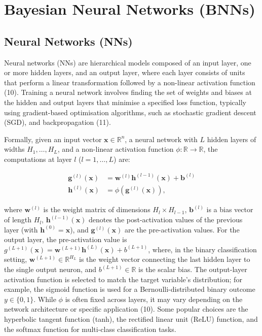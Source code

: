 \documentclass[
  a4paper,
]{scrreprt}
\begin{document}
\section{Bayesian Neural Networks
(BNNs)}\label{bayesian-neural-networks-bnns}

\subsection{Neural Networks (NNs)}\label{neural-networks-nns}

Neural networks (NNs) are hierarchical models composed of an input
layer, one or more hidden layers, and an output layer, where each layer
consists of units that perform a linear transformation followed by a
non-linear activation function (10). Training a neural network involves
finding the set of weights and biases at the hidden and output layers
that minimise a specified loss function, typically using gradient-based
optimisation algorithms, such as stochastic gradient descent (SGD), and
backpropagation (11).

Formally, given an input vector \(\mathbf{x} \in \mathbb{R}^n\), a
neural network with \(L\) hidden layers of widths \(H_1, \dots, H_L\),
and a non-linear activation function
\(\phi: \mathbb{R} \rightarrow \mathbb{R}\), the computations at layer
\(l\) (\(l = 1, \dots, L\)) are:

\[
\begin{aligned}
\mathbf{g}^{(l)}(\mathbf{x}) &= \mathbf{w}^{(l)} \mathbf{h}^{(l-1)}(\mathbf{x}) + \mathbf{b}^{(l)} \\
\mathbf{h}^{(l)}(\mathbf{x}) &= \phi\left(\mathbf{g}^{(l)}(\mathbf{x})\right),
\end{aligned}
\]

where \(\mathbf{w}^{(l)}\) is the weight matrix of dimensions
\(H_l \times H_{l-1}\), \(\mathbf{b}^{(l)}\) is a bias vector of length
\(H_l\), \(\mathbf{h}^{(l-1)}(\mathbf{x})\) denotes the post-activation
values of the previous layer (with \(\mathbf{h}^{(0)} = \mathbf{x}\)),
and \(\mathbf{g}^{(l)}(\mathbf{x})\) are the pre-activation values. For
the output layer, the pre-activation value is
\(g^{(L+1)}(\mathbf{x}) = \mathbf{w}^{(L+1)} \mathbf{h}^{(L)}(\mathbf{x}) + b^{(L+1)}\),
where, in the binary classification setting,
\(\mathbf{w}^{(L+1)} \in \mathbb{R}^{H_L}\) is the weight vector
connecting the last hidden layer to the single output neuron, and
\(b^{(L+1)} \in \mathbb{R}\) is the scalar bias. The output-layer
activation function is selected to match the target variable's
distribution; for example, the sigmoid function is used for a
Bernoulli-distributed binary outcome \(y \in \{0,1\}\). While \(\phi\)
is often fixed across layers, it may vary depending on the network
architecture or specific application (10). Some popular choices are the
hyperbolic tangent function (tanh), the rectified linear unit (ReLU)
function, and the softmax function for multi-class classification tasks.
\end{document}
